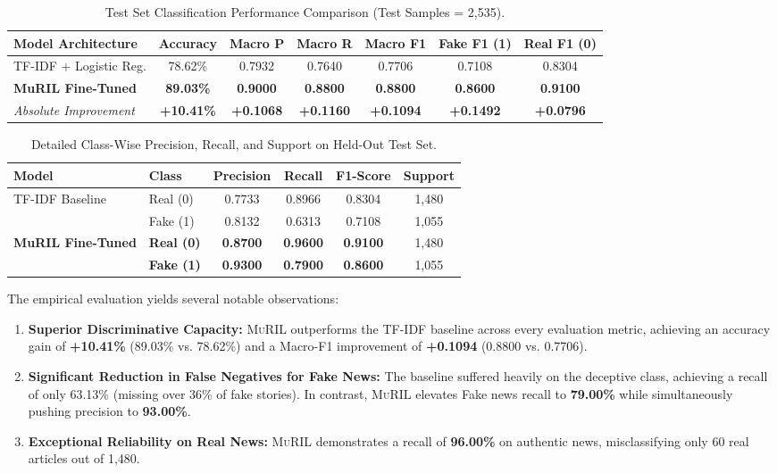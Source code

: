 \documentclass[11pt,a4paper]{article}
\begin{document}
\begin{table}[h]
\centering
\caption{Test Set Classification Performance Comparison (Test Samples = 2,535).}
\label{tab:main_results}
\begin{tabularx}{\textwidth}{lcccccc}
\toprule
\textbf{Model Architecture} & \textbf{Accuracy} & \textbf{Macro P} & \textbf{Macro R} & \textbf{Macro F1} & \textbf{Fake F1 (1)} & \textbf{Real F1 (0)} \\
\midrule
TF-IDF + Logistic Reg. & 78.62\% & 0.7932 & 0.7640 & 0.7706 & 0.7108 & 0.8304 \\
\textbf{MuRIL Fine-Tuned} & \textbf{89.03\%} & \textbf{0.9000} & \textbf{0.8800} & \textbf{0.8800} & \textbf{0.8600} & \textbf{0.9100} \\
\midrule
\textit{Absolute Improvement} & \textbf{+10.41\%} & \textbf{+0.1068} & \textbf{+0.1160} & \textbf{+0.1094} & \textbf{+0.1492} & \textbf{+0.0796} \\
\bottomrule
\end{tabularx}
\end{table}

\begin{table}[h]
\centering
\caption{Detailed Class-Wise Precision, Recall, and Support on Held-Out Test Set.}
\label{tab:detailed_class_metrics}
\begin{tabular}{llcccc}
\toprule
\textbf{Model} & \textbf{Class} & \textbf{Precision} & \textbf{Recall} & \textbf{F1-Score} & \textbf{Support} \\
\midrule
\multirow{2}{*}{TF-IDF Baseline} & Real (0) & 0.7733 & 0.8966 & 0.8304 & 1,480 \\
 & Fake (1) & 0.8132 & 0.6313 & 0.7108 & 1,055 \\
\midrule
\multirow{2}{*}{\textbf{MuRIL Fine-Tuned}} & \textbf{Real (0)} & \textbf{0.8700} & \textbf{0.9600} & \textbf{0.9100} & 1,480 \\
 & \textbf{Fake (1)} & \textbf{0.9300} & \textbf{0.7900} & \textbf{0.8600} & 1,055 \\
\bottomrule
\end{tabular}
\end{table}

The empirical evaluation yields several notable observations:
\begin{enumerate}[leftmargin=*]
    \item \textbf{Superior Discriminative Capacity:} \textsc{MuRIL} outperforms the TF-IDF baseline across every evaluation metric, achieving an accuracy gain of \textbf{+10.41\%} (89.03\% vs. 78.62\%) and a Macro-F1 improvement of \textbf{+0.1094} (0.8800 vs. 0.7706).
    \item \textbf{Significant Reduction in False Negatives for Fake News:} The baseline suffered heavily on the deceptive class, achieving a recall of only 63.13\% (missing over 36\% of fake stories). In contrast, \textsc{MuRIL} elevates Fake news recall to \textbf{79.00\%} while simultaneously pushing precision to \textbf{93.00\%}.
    \item \textbf{Exceptional Reliability on Real News:} \textsc{MuRIL} demonstrates a recall of \textbf{96.00\%} on authentic news, misclassifying only 60 real articles out of 1,480.
\end{enumerate}
\end{document}

